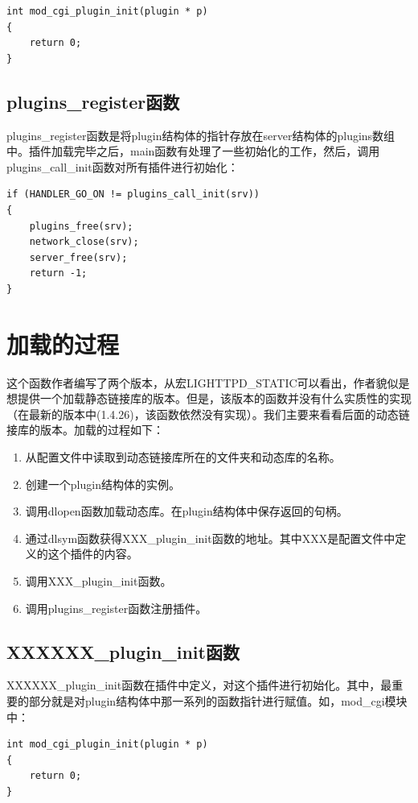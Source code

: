 \documentclass[dvipdfm]{book}
\begin{document}
\begin{verbatim}
int mod_cgi_plugin_init(plugin * p)
{
	return 0;
}
\end{verbatim}


\subsection{plugins\_register函数}
plugins\_register函数是将plugin结构体的指针存放在server结构体的plugins数组中。插件加载完毕之后，main函数有处理了一些初始化的工作，然后，调用plugins\_call\_init函数对所有插件进行初始化：

\begin{verbatim}
if (HANDLER_GO_ON != plugins_call_init(srv)) 
{
	plugins_free(srv);
	network_close(srv);
	server_free(srv);
	return -1;
}
\end{verbatim}

\section{加载的过程}
这个函数作者编写了两个版本，从宏LIGHTTPD\_STATIC可以看出，作者貌似是想提供一个加载静态链接库的版本。但是，该版本的函数并没有什么实质性的实现（在最新的版本中(1.4.26)，该函数依然没有实现）。我们主要来看看后面的动态链接库的版本。加载的过程如下：
\begin{enumerate}
	\item 从配置文件中读取到动态链接库所在的文件夹和动态库的名称。
	\item 创建一个plugin结构体的实例。
	\item 调用dlopen函数加载动态库。在plugin结构体中保存返回的句柄。
	\item 通过dlsym函数获得XXX\_plugin\_init函数的地址。其中XXX是配置文件中定义的这个插件的内容。
	\item 调用XXX\_plugin\_init函数。
	\item 调用plugins\_register函数注册插件。
\end{enumerate}

\subsection{XXXXXX\_plugin\_init函数}
XXXXXX\_plugin\_init函数在插件中定义，对这个插件进行初始化。其中，最重要的部分就是对plugin结构体中那一系列的函数指针进行赋值。如，mod\_cgi模块中：

\begin{verbatim}
int mod_cgi_plugin_init(plugin * p)
{
	return 0;
}
\end{verbatim}
\end{document}

